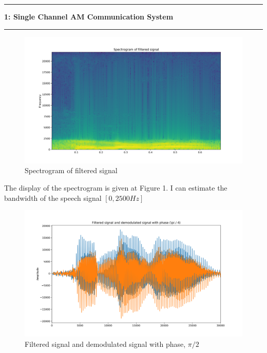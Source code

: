 \documentclass[11pt]{article}
\newcommand\question[2]{\vspace{.25in}\hrule\textbf{#1: #2}\vspace{.5em}\hrule\vspace{.10in}}
\begin{document}
\raggedright
\newcommand\NAME{Kadir Emre Otod}  %
\newcommand\ANDREWID{150140032}     %
\newcommand\HWNUM{4}              %


\question{1}{Single Channel AM Communication System} 

\begin{figure}[h]
	\centering
	\includegraphics[width=0.8\linewidth]{figure-3}
	\caption{Spectrogram of filtered signal}
\end{figure}

The display of the spectrogram is given at Figure 1. I can estimate the bandwidth of the speech signal $\left[0, 2500Hz\right]$

\begin{figure}[h]
	\centering
	\includegraphics[width=0.8\linewidth]{figure-1}
	\caption{Filtered signal and demodulated signal with phase, $\pi / 2$}
\end{figure}
\end{document}
